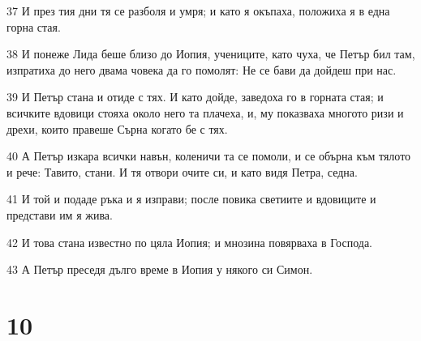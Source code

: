 \par 37 И през тия дни тя се разболя и умря; и като я окъпаха, положиха я в една горна стая.
\par 38 И понеже Лида беше близо до Иопия, учениците, като чуха, че Петър бил там, изпратиха до него двама човека да го помолят: Не се бави да дойдеш при нас.
\par 39 И Петър стана и отиде с тях. И като дойде, заведоха го в горната стая; и всичките вдовици стояха около него та плачеха, и, му показваха многото ризи и дрехи, които правеше Сърна когато бе с тях.
\par 40 А Петър изкара всички навън, коленичи та се помоли, и се обърна към тялото и рече: Тавито, стани. И тя отвори очите си, и като видя Петра, седна.
\par 41 И той и подаде ръка и я изправи; после повика светиите и вдовиците и представи им я жива.
\par 42 И това стана известно по цяла Иопия; и мнозина повярваха в Господа.
\par 43 А Петър преседя дълго време в Иопия у някого си Симон.

\chapter{10}

